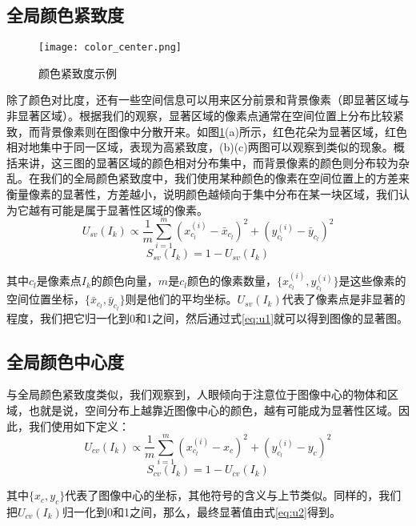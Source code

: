 \subsection{全局颜色紧致度}
\begin{figure}
\centering
\texttt{[image: color\_center.png]}
\caption{颜色紧致度示例}\label{fig:color_center}
\end{figure}
除了颜色对比度，还有一些空间信息可以用来区分前景和背景像素（即显著区域与非显著区域）。根据我们的观察，显著区域的像素点通常在空间位置上分布比较紧致，而背景像素则在图像中分散开来。如图\ref{fig:color_center}(a)所示，红色花朵为显著区域，红色相对地集中于同一区域，表现为高紧致度，(b)(c)两图可以观察到类似的现象。概括来讲，这三图的显著区域的颜色相对分布集中，而背景像素的颜色则分布较为杂乱。在我们的全局颜色紧致度中，我们使用某种颜色的像素在空间位置上的方差来衡量像素的显著性，方差越小，说明颜色越倾向于集中分布在某一块区域，我们认为它越有可能是属于显著性区域的像素。
\begin{equation}
  U_{sv}(I_k) \propto \frac{1}{m}\sum_{i=1}^{m}(x_{c_l}^{(i)} - \bar{x}_{c_l})^2 + (y_{c_l}^{(i)} - \bar{y}_{c_l})^2 \label{eq:u0}
\end{equation}
\begin{equation}
  S_{sv}(I_k) = 1 - U_{sv}(I_k) \label{eq:u1}
\end{equation}

其中$c_l$是像素点$I_k$的颜色向量，$m$是$c_l$颜色的像素数量，$\{x_{c_l}^{(i)},y_{c_l}^{(i)}\}$是这些像素的空间位置坐标，$\{\bar{x}_{c_l},\bar{y}_{c_l}\}$则是他们的平均坐标。$U_{sv}(I_k)$代表了像素点是非显著的程度，我们把它归一化到0和1之间，然后通过式\ref{eq:u1}就可以得到图像的显著图。

\subsection{全局颜色中心度}
与全局颜色紧致度类似，我们观察到，人眼倾向于注意位于图像中心的物体和区域，也就是说，空间分布上越靠近图像中心的颜色，越有可能成为显著性区域。因此，我们使用如下定义：
\begin{equation}
  U_{cv}(I_k) \propto \frac{1}{m}\sum_{i=1}^{m}(x_{c_l}^{(i)} - x_c)^2 + (y_{c_l}^{(i)} - y_c)^2
\end{equation}
\begin{equation}
  S_{cv}(I_k) = 1 - U_{cv}(I_k) \label{eq:u2}
\end{equation}

其中$\{x_c, y_c\}$代表了图像中心的坐标，其他符号的含义与上节类似。同样的，我们把$U_{cv}(I_k)$归一化到0和1之间，那么，最终显著值由式\ref{eq:u2}得到。

